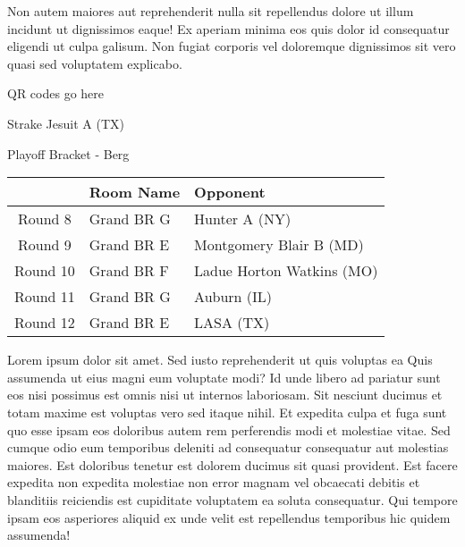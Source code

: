 \documentclass{article}%
\begin{document}
\newline%
Non autem maiores aut reprehenderit nulla sit repellendus dolore ut illum incidunt ut dignissimos eaque! Ex aperiam minima eos quis dolor id consequatur eligendi ut culpa galisum. Non fugiat corporis vel doloremque dignissimos sit vero quasi sed voluptatem explicabo.\newline%
\newline%
%
\vspace*{30pt}%
\begin{center}%
\begin{Huge}%
QR codes go here%
\end{Huge}%
\end{center}%
\newpage%
\begin{center}%
\begin{Huge}%
Strake Jesuit A (TX)%
\end{Huge}%
\vspace*{8pt}%
\linebreak%
\begin{Large}%
Playoff Bracket {-} Berg%
\end{Large}%
\end{center}%
%
\begin{tabularx}{\textwidth}{|c|Y|Y|}%
\hline%
&Room Name&Opponent\\%
\hline%
Round 8&Grand BR G&Hunter A (NY)\\%
Round 9&Grand BR E&Montgomery Blair B (MD)\\%
Round 10&Grand BR F&Ladue Horton Watkins (MO)\\%
Round 11&Grand BR G&Auburn (IL)\\%
Round 12&Grand BR E&LASA (TX)\\%
\hline%
\end{tabularx}%
\vspace*{8pt}%
\linebreak%
\newline%
\newline%
Lorem ipsum dolor sit amet. Sed iusto reprehenderit ut quis voluptas ea Quis assumenda ut eius magni eum voluptate modi? Id unde libero ad pariatur sunt eos nisi possimus est omnis nisi ut internos laboriosam. Sit nesciunt ducimus et totam maxime est voluptas vero sed itaque nihil. Et expedita culpa et fuga sunt quo esse ipsam eos doloribus autem rem perferendis modi et molestiae vitae.\newline%
\newline%
Sed cumque odio eum temporibus deleniti ad consequatur consequatur aut molestias maiores. Est doloribus tenetur est dolorem ducimus sit quasi provident. Est facere expedita non expedita molestiae non error magnam vel obcaecati debitis et blanditiis reiciendis est cupiditate voluptatem ea soluta consequatur. Qui tempore ipsam eos asperiores aliquid ex unde velit est repellendus temporibus hic quidem assumenda!\newline%
\end{document}
